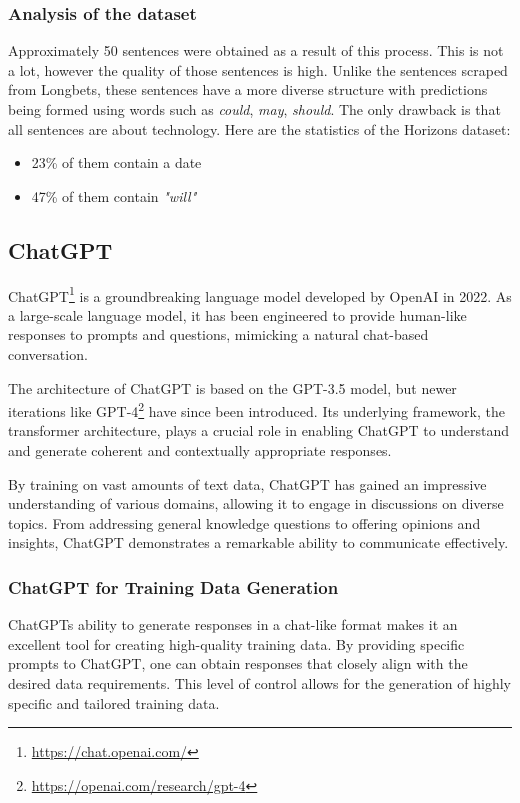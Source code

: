 \documentclass[a4paper,10pt]{report}
\begin{document}
\subsubsection{Analysis of the dataset}
Approximately 50 sentences were obtained as a result of this process. This is not a lot, however the quality of those sentences is high. Unlike the sentences scraped from Longbets, these sentences have a more diverse structure with predictions being formed using words such as \textit{could}, \textit{may}, \textit{should}. The only drawback is that all sentences are about technology. Here are the statistics of the Horizons dataset:

\begin{itemize}
  \item 23\% of them contain a date
  \item 47\% of them contain \textit{"will"}
\end{itemize}


\subsection{ChatGPT} %
ChatGPT\footnote{\url{https://chat.openai.com/}} is a groundbreaking language model developed by OpenAI in 2022. As a large-scale language model, it has been engineered to provide human-like responses to prompts and questions, mimicking a natural chat-based conversation. 

The architecture of ChatGPT is based on the GPT-3.5 model, but newer iterations like GPT-4\footnote{\url{https://openai.com/research/gpt-4}} have since been introduced. Its underlying framework, the transformer architecture, plays a crucial role in enabling ChatGPT to understand and generate coherent and contextually appropriate responses.

By training on vast amounts of text data, ChatGPT has gained an impressive understanding of various domains, allowing it to engage in discussions on diverse topics. From addressing general knowledge questions to offering opinions and insights, ChatGPT demonstrates a remarkable ability to communicate effectively. \cite{OpenAIChatGPT}

\subsubsection{ChatGPT for Training Data Generation}
ChatGPTs ability to generate responses in a chat-like format makes it an excellent tool for creating high-quality training data. By providing specific prompts to ChatGPT, one can obtain responses that closely align with the desired data requirements. This level of control allows for the generation of highly specific and tailored training data.
\end{document}
